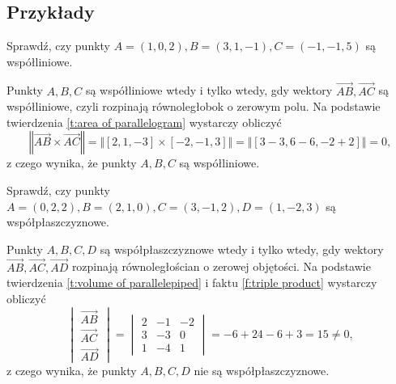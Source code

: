 \subsection{Przykłady}
\begin{example}
    Sprawdź, czy punkty $A = (1, 0, 2), B = (3, 1, -1), C = (-1, -1, 5)$ są współliniowe.
\end{example}
\begin{solution}
    Punkty $A, B, C$ są współliniowe wtedy i tylko wtedy, gdy wektory $\overrightarrow{AB}, \overrightarrow{AC}$ są współliniowe, czyli rozpinają równoległobok o zerowym polu. Na podstawie twierdzenia \ref{t:area of parallelogram} wystarczy obliczyć
    \[ \left\Vert\overrightarrow{AB}\times\overrightarrow{AC}\right\Vert = \Vert[2, 1, -3] \times [-2, -1, 3]\Vert = \Vert[3 - 3, 6 - 6, -2 + 2]\Vert = 0, \]
    z czego wynika, że punkty $A, B, C$ są współliniowe.
\end{solution}

\begin{example}
    Sprawdź, czy punkty $A = (0, 2, 2), B = (2, 1, 0), C = (3, -1, 2), D = (1, -2, 3)$ są współpłaszczyznowe.
\end{example}
\begin{solution}
    Punkty $A, B, C, D$ są współpłaszczyznowe wtedy i tylko wtedy, gdy wektory $\overrightarrow{AB}, \overrightarrow{AC}, \overrightarrow{AD}$ rozpinają równoległościan o zerowej objętości. Na podstawie twierdzenia \ref{t:volume of parallelepiped} i faktu \ref{f:triple product} wystarczy obliczyć
    \[ \begin{vmatrix}
        \overrightarrow{AB} \\
        \overrightarrow{AC} \\
        \overrightarrow{AD}
    \end{vmatrix} = \begin{vmatrix}
        2 & -1 & -2 \\
        3 & -3 & 0 \\
        1 & -4 & 1
    \end{vmatrix} = -6 + 24 - 6 + 3 = 15 \neq 0, \]
    z czego wynika, że punkty $A, B, C, D$ nie są współpłaszczyznowe.
\end{solution}

